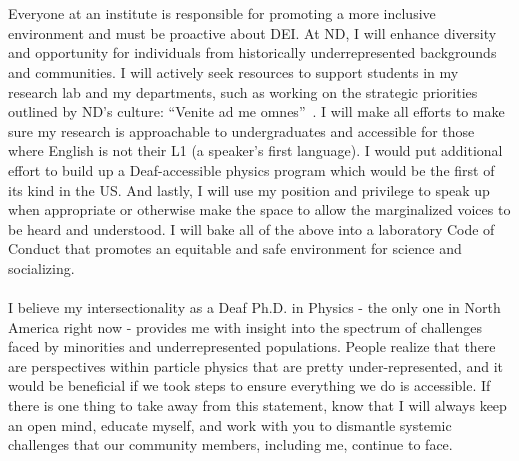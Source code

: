 \documentclass[10pt,a4paper,sans]{moderncv} %
\begin{document}
\\
\\
Everyone at an institute is responsible for promoting a more inclusive environment and must be proactive about DEI. At ND, I will enhance diversity and opportunity for individuals from historically underrepresented backgrounds and communities. I will actively seek resources to support students in my research lab and my departments, such as working on the strategic priorities outlined by ND's culture: ``Venite ad me omnes''~\cite{campusplan}. I will make all efforts to make sure my research is approachable to undergraduates and accessible for those where English is not their L1 (a speaker's first language). I would put additional effort to build up a Deaf-accessible physics program which would be the first of its kind in the US. And lastly, I will use my position and privilege to speak up when appropriate or otherwise make the space to allow the marginalized voices to be heard and understood. I will bake all of the above into a laboratory Code of Conduct that promotes an equitable and safe environment for science and socializing.
\\
\\
I believe my intersectionality as a Deaf Ph.D. in Physics - the only one in North America right now - provides me with insight into the spectrum of challenges faced by minorities and underrepresented populations. People realize that there are perspectives within particle physics that are pretty under-represented, and it would be beneficial if we took steps to ensure everything we do is accessible. If there is one thing to take away from this statement, know that I will always keep an open mind, educate myself, and work with you to dismantle systemic challenges that our community members, including me, continue to face.

\printbibliography
\end{document}
